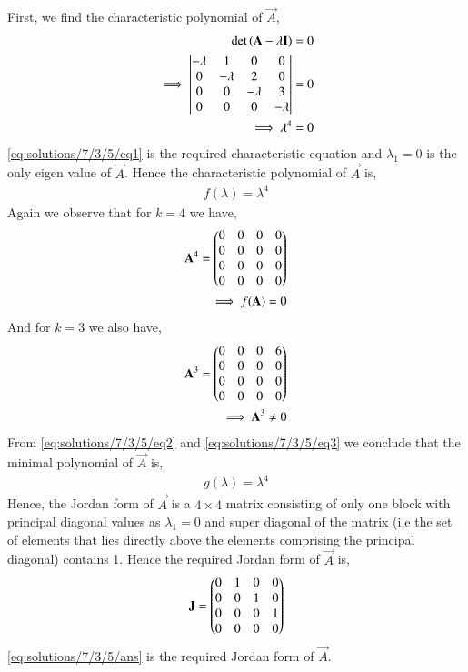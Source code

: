 First, we find the characteristic polynomial of $\vec{A}$,
\begin{align}
\det{(\mathbf{A}-\lambda\mathbf{I})} &= 0\\
\implies \begin{vmatrix}-\lambda&1&0&0\\0&-\lambda&2&0\\0&0&-\lambda&3\\0&0&0&-\lambda\end{vmatrix} &= 0\\
\implies \lambda^4 &= 0\label{eq:solutions/7/3/5/eq1}
\end{align}
\eqref{eq:solutions/7/3/5/eq1} is the required characteristic equation and $\lambda_1 = 0$ is the only eigen value of $\vec{A}$. Hence the characteristic polynomial of $\vec{A}$ is,
\begin{align}
f(\lambda) = \lambda^4 \label{eq:solutions/7/3/5/eqChar}
\end{align}
Again we observe that for $k=4$ we have,
\begin{align}
\mathbf{A}^4 = \begin{pmatrix}0&0&0&0\\0&0&0&0\\0&0&0&0\\0&0&0&0\end{pmatrix}\\
\implies f(\mathbf{A}) = 0 \label{eq:solutions/7/3/5/eq2}
\end{align}
And for $k=3$ we also have,
\begin{align}
\mathbf{A}^3 = \begin{pmatrix}0&0&0&6\\0&0&0&0\\0&0&0&0\\0&0&0&0\end{pmatrix}\\
\implies \mathbf{A}^3 \ne 0 \label{eq:solutions/7/3/5/eq3}
\end{align}
From \eqref{eq:solutions/7/3/5/eq2} and \eqref{eq:solutions/7/3/5/eq3} we conclude that the minimal polynomial of $\vec{A}$ is, 
\begin{align}
g(\lambda) = \lambda^4 \label{eq:solutions/7/3/5/eq4}
\end{align}
Hence, the Jordan form of $\vec{A}$ is a $4 \times 4$ matrix consisting of only one block with principal diagonal values as $\lambda_1 = 0$ and super diagonal of the matrix (i.e the set of elements that lies directly above the elements comprising the principal diagonal) contains 1. Hence the required Jordan form of $\vec{A}$ is,
\begin{align}
\mathbf{J} = \begin{pmatrix}0&1&0&0\\0&0&1&0\\0&0&0&1\\0&0&0&0\end{pmatrix}\label{eq:solutions/7/3/5/ans}
\end{align}
\eqref{eq:solutions/7/3/5/ans} is the required Jordan form of $\vec{A}$.
